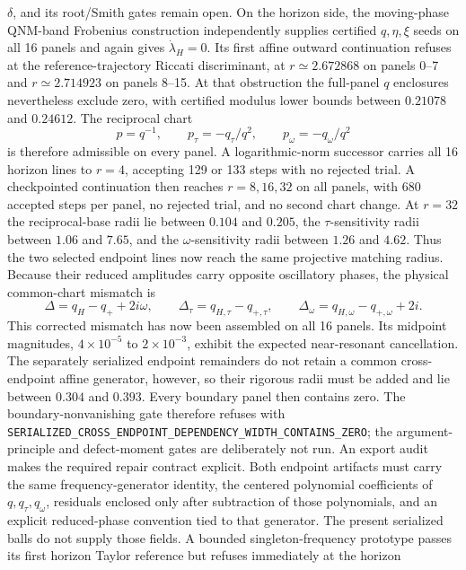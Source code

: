 \documentclass[11pt]{article}
\theoremstyle{definition}
\theoremstyle{remark}
\begin{document}
\(\delta\), and its root/Smith gates remain open.  On the horizon side, the
moving-phase QNM-band Frobenius construction independently supplies
certified \(q,\eta,\xi\) seeds on all 16 panels and again gives
\(\dot\lambda_H=0\).  Its first affine outward continuation refuses at the
reference-trajectory Riccati discriminant, at
\(r\simeq2.672868\) on panels 0--7 and \(r\simeq2.714923\) on panels 8--15.
At that obstruction the full-panel \(q\) enclosures nevertheless exclude
zero, with certified modulus lower bounds between \(0.21078\) and \(0.24612\).
The reciprocal chart
\[
 p=q^{-1},\qquad
 p_\tau=-q_\tau/q^2,\qquad
 p_\omega=-q_\omega/q^2
\]
is therefore admissible on every panel.  A logarithmic-norm successor carries
all 16 horizon lines to \(r=4\), accepting 129 or 133 steps with no rejected
trial.  A checkpointed continuation then reaches \(r=8,16,32\) on all
panels, with 680 accepted steps per panel, no rejected trial, and no second
chart change.  At \(r=32\) the reciprocal-base radii lie between \(0.104\)
and \(0.205\), the \(\tau\)-sensitivity radii between \(1.06\) and \(7.65\),
and the \(\omega\)-sensitivity radii between \(1.26\) and \(4.62\).  Thus the
two selected endpoint lines now reach the same projective matching radius.
Because their reduced amplitudes carry opposite oscillatory phases, the
physical common-chart mismatch is
\[
 \Delta=q_H-q_++2i\omega,\qquad
 \Delta_\tau=q_{H,\tau}-q_{+,\tau},\qquad
 \Delta_\omega=q_{H,\omega}-q_{+,\omega}+2i.
\]
This corrected mismatch has now been assembled on all 16 panels.  Its
midpoint magnitudes, \(4\times10^{-5}\) to \(2\times10^{-3}\), exhibit the
expected near-resonant cancellation.  The separately serialized endpoint
remainders do not retain a common cross-endpoint affine generator, however,
so their rigorous radii must be added and lie between \(0.304\) and \(0.393\).
Every boundary panel then contains zero.  The boundary-nonvanishing gate
therefore refuses with
\texttt{SERIALIZED\_CROSS\_ENDPOINT\_DEPENDENCY\_WIDTH\_CONTAINS\_ZERO};
the argument-principle and defect-moment gates are deliberately not run.
An export audit makes the required repair contract explicit.  Both endpoint
artifacts must carry the same frequency-generator identity, the centered
polynomial coefficients of \(q,q_\tau,q_\omega\), residuals enclosed only
after subtraction of those polynomials, and an explicit reduced-phase
convention tied to that generator.  The present serialized balls do not
supply those fields.  A bounded singleton-frequency prototype passes its
first horizon Taylor reference but refuses immediately at the horizon
\end{document}
